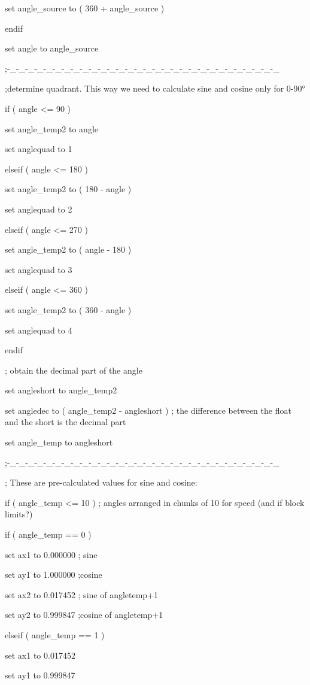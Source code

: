 \documentclass[
]{article}
\begin{document}
set angle\_source to ( 360 + angle\_source )

endif

set angle to angle\_source

;-\_-\_-\_-\_-\_-\_-\_-\_-\_-\_-\_-\_-\_-\_-\_-\_-\_-\_-\_-\_-\_-\_-\_-\_-\_-\_-\_-\_-\_-\_

;determine quadrant. This way we need to calculate sine and cosine only
for 0-90°

if ( angle \textless= 90 )

set angle\_temp2 to angle

set anglequad to 1

elseif ( angle \textless= 180 )

set angle\_temp2 to ( 180 - angle )

set anglequad to 2

elseif ( angle \textless= 270 )

set angle\_temp2 to ( angle - 180 )

set anglequad to 3

elseif ( angle \textless= 360 )

set angle\_temp2 to ( 360 - angle )

set anglequad to 4

endif

; obtain the decimal part of the angle

set angleshort to angle\_temp2

set angledec to ( angle\_temp2 - angleshort ) ; the difference between
the float and the short is the decimal part

set angle\_temp to angleshort

;-\_-\_-\_-\_-\_-\_-\_-\_-\_-\_-\_-\_-\_-\_-\_-\_-\_-\_-\_-\_-\_-\_-\_-\_-\_-\_-\_-\_-\_-\_

; These are pre-calculated values for sine and cosine:

if ( angle\_temp \textless= 10 ) ; angles arranged in chunks of 10 for
speed (and if block limits?)

if ( angle\_temp == 0 )

set ax1 to 0.000000 ; sine

set ay1 to 1.000000 ;cosine

set ax2 to 0.017452 ; sine of angletemp+1

set ay2 to 0.999847 ;cosine of angletemp+1

elseif ( angle\_temp == 1 )

set ax1 to 0.017452

set ay1 to 0.999847
\end{document}
